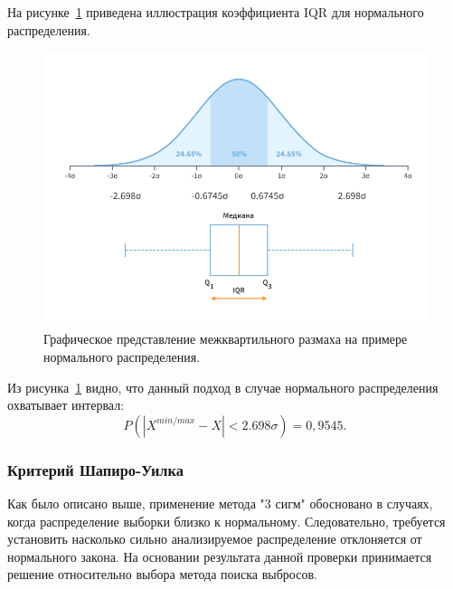 На рисунке~\ref{fig:ris6} приведена иллюстрация коэффициента IQR для нормального распределения.

\begin{figure}[H]
	\centering
	\includegraphics[width=1\linewidth]{pics/ris6} %
	\caption{Графическое представление межквартильного размаха на примере нормального распределения.}
	\label{fig:ris6} %
\end{figure}

Из рисунка~\ref{fig:ris6} видно, что данный подход в случае нормального распределения охватывает интервал:
\begin{equation} \label{eq:IQRP}
	P(|X^{min/max} - X| < 2.698\sigma)  = 0,9545.
\end{equation}



\subsubsection{Критерий Шапиро-Уилка}
Как было описано выше, применение метода "3 сигм" обосновано в случаях, когда распределение выборки близко к нормальному. Следовательно, требуется установить насколько сильно анализируемое распределение отклоняется от нормального закона.
На основании результата данной проверки принимается решение относительно выбора метода поиска выбросов. 

